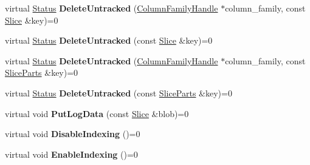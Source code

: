 \begin{DoxyCompactItemize}
\item 
virtual \hyperlink{classrocksdb_1_1Status}{Status} {\bfseries Delete\+Untracked} (\hyperlink{classrocksdb_1_1ColumnFamilyHandle}{Column\+Family\+Handle} $\ast$column\+\_\+family, const \hyperlink{classrocksdb_1_1Slice}{Slice} \&key)=0\hypertarget{classrocksdb_1_1Transaction_ab48ab6a85b09f520475e7db59a322d30}{}\label{classrocksdb_1_1Transaction_ab48ab6a85b09f520475e7db59a322d30}

\item 
virtual \hyperlink{classrocksdb_1_1Status}{Status} {\bfseries Delete\+Untracked} (const \hyperlink{classrocksdb_1_1Slice}{Slice} \&key)=0\hypertarget{classrocksdb_1_1Transaction_a51f1f2080972259e9e9a3b89f05960c9}{}\label{classrocksdb_1_1Transaction_a51f1f2080972259e9e9a3b89f05960c9}

\item 
virtual \hyperlink{classrocksdb_1_1Status}{Status} {\bfseries Delete\+Untracked} (\hyperlink{classrocksdb_1_1ColumnFamilyHandle}{Column\+Family\+Handle} $\ast$column\+\_\+family, const \hyperlink{structrocksdb_1_1SliceParts}{Slice\+Parts} \&key)=0\hypertarget{classrocksdb_1_1Transaction_ad06c008cbc366e28a0eab6f2b72d1e62}{}\label{classrocksdb_1_1Transaction_ad06c008cbc366e28a0eab6f2b72d1e62}

\item 
virtual \hyperlink{classrocksdb_1_1Status}{Status} {\bfseries Delete\+Untracked} (const \hyperlink{structrocksdb_1_1SliceParts}{Slice\+Parts} \&key)=0\hypertarget{classrocksdb_1_1Transaction_a80088cbe97e4008dd2cb3371fa908b2c}{}\label{classrocksdb_1_1Transaction_a80088cbe97e4008dd2cb3371fa908b2c}

\item 
virtual void {\bfseries Put\+Log\+Data} (const \hyperlink{classrocksdb_1_1Slice}{Slice} \&blob)=0\hypertarget{classrocksdb_1_1Transaction_af53a4039368b9bf64b62075ddd428ee0}{}\label{classrocksdb_1_1Transaction_af53a4039368b9bf64b62075ddd428ee0}

\item 
virtual void {\bfseries Disable\+Indexing} ()=0\hypertarget{classrocksdb_1_1Transaction_a97d187ddd9226a15ca0ab8a740236705}{}\label{classrocksdb_1_1Transaction_a97d187ddd9226a15ca0ab8a740236705}

\item 
virtual void {\bfseries Enable\+Indexing} ()=0\hypertarget{classrocksdb_1_1Transaction_af765d06ee7f217c371c92e5ba06d6e70}{}\label{classrocksdb_1_1Transaction_af765d06ee7f217c371c92e5ba06d6e70}


\end{DoxyCompactItemize}
